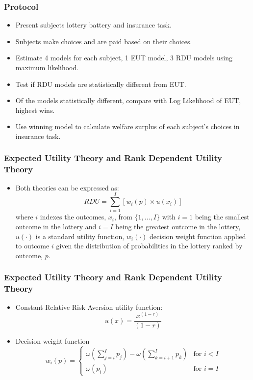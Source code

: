 \documentclass{beamer}
\begin{document}
\begin{frame}
\frametitle{\textcite{Harrison2016} Protocol}
\begin{itemize}
	\item Present subjects lottery battery and insurance task.
	\item Subjects make choices and are paid based on their choices.
	\item Estimate 4 models for each subject, 1 EUT model, 3 RDU models using maximum likelihood.
	\item Test if RDU models are statistically different from EUT.
	\item Of the models statistically different, compare with Log Likelihood of EUT, highest wins.
	\item Use winning model to calculate welfare surplus of each subject's choices in insurance task.
\end{itemize}
\end{frame}

\begin{frame}
\frametitle{Expected Utility Theory and Rank Dependent Utility Theory}
\begin{itemize}
	\item Both theories can be expressed as:
	\begin{equation}
		\label{eq4:RDU}
		RDU = \sum_{i=1}^{I} \left[ w_i(p) \times u(x_i) \right]
	\end{equation}
\noindent where $i$ indexes the outcomes, $x_i$, from $\{1,\ldots,I\}$ with $i=1$ being the smallest outcome in the lottery and $i=I$ being the greatest outcome in the lottery, $u(\cdot)$ is a standard utility function, $w_i(\cdot)$ decision weight function applied to outcome $i$ given the distribution of probabilities in the lottery ranked by outcome, $p$.
\end{itemize}
\end{frame}

\begin{frame}
\frametitle{Expected Utility Theory and Rank Dependent Utility Theory}
\begin{itemize}
	\item Constant Relative Risk Aversion utility function:
	\begin{equation}
		\label{eq4:CRRA}
		u(x) = \frac{x^{(1-r)}}{(1-r)}
	\end{equation}
	\item Decision weight function
	\begin{equation}
		\label{eq4:dweight}
		w_i(p) =
		\begin{cases}
			\omega\left(\displaystyle\sum_{j=i}^I p_j\right) - \omega\left(\displaystyle\sum_{k=i+1}^I p_k\right) & \text{for } i<I \\
			\omega(p_i) & \text{for } i = I
		\end{cases}
	\end{equation}
\end{itemize}
\end{frame}
\end{document}

